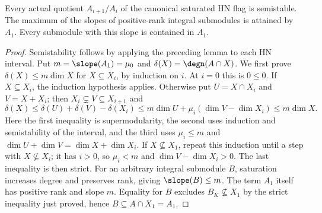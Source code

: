 \begin{lemma}
\label{lem:hermitian-hn-maximal-slope}
\leanok
Every actual quotient $A_{i+1}/A_i$ of the canonical saturated HN flag
is semistable. The maximum of the slopes of positive-rank integral
submodules is attained by $A_1$. Every submodule with this slope is
contained in $A_1$.
\end{lemma}
\begin{proof}
Semistability follows by applying the preceding lemma to each HN
interval. Put $m=\slope(A_1)=\mu_0$ and $\delta(X)=\degn(A\cap X)$.
We first prove $\delta(X)\leq m\dim X$ for $X\subseteq X_i$, by
induction on $i$. At $i=0$ this is $0\leq0$. If $X\subseteq X_i$,
the induction hypothesis applies. Otherwise put $U=X\cap X_i$ and
$V=X+X_i$; then $X_i\subsetneq V\subseteq X_{i+1}$ and
\[
 \delta(X)\leq\delta(U)+\delta(V)-\delta(X_i)
 \leq m\dim U+\mu_i(\dim V-\dim X_i)
 \leq m\dim X.
\]
Here the first inequality is supermodularity, the second uses induction
and semistability of the interval, and the third uses $\mu_i\leq m$
and $\dim U+\dim V=\dim X+\dim X_i$.
If $X\not\subseteq X_1$, repeat this induction until a step with
$X\not\subseteq X_i$; it has $i>0$, so $\mu_i<m$ and
$\dim V-\dim X_i>0$. The last inequality is then strict.
For an arbitrary integral submodule $B$, saturation increases degree
and preserves rank, giving $\slope(B)\leq m$. The term $A_1$ itself
has positive rank and slope $m$. Equality for $B$ excludes
$B_K\not\subseteq X_1$ by the strict inequality just proved, hence
$B\subseteq A\cap X_1=A_1$.
\end{proof}

